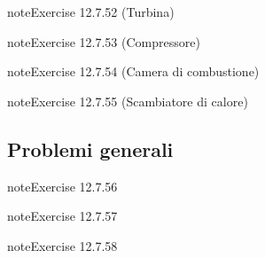 \documentclass[letterpaper,10pt,italian]{jupyterBook}
\begin{document}
\begin{sphinxadmonition}{note}{Exercise 12.7.52 (Turbina)}


\end{sphinxadmonition}
 \label{exercise:ch/thermodynamics/principles-problems-exercise-52}

\begin{sphinxadmonition}{note}{Exercise 12.7.53 (Compressore)}


\end{sphinxadmonition}
 \label{exercise:ch/thermodynamics/principles-problems-exercise-53}

\begin{sphinxadmonition}{note}{Exercise 12.7.54 (Camera di combustione)}


\end{sphinxadmonition}
 \label{exercise:ch/thermodynamics/principles-problems-exercise-54}

\begin{sphinxadmonition}{note}{Exercise 12.7.55 (Scambiatore di calore)}


\end{sphinxadmonition}


\subsection{Problemi generali}
\label{\detokenize{ch/thermodynamics/principles-problems:problemi-generali}} \label{exercise:ch/thermodynamics/principles-problems-exercise-55}

\begin{sphinxadmonition}{note}{Exercise 12.7.56}


\end{sphinxadmonition}
 \label{exercise:ch/thermodynamics/principles-problems-exercise-56}

\begin{sphinxadmonition}{note}{Exercise 12.7.57}


\end{sphinxadmonition}
 \label{exercise:ch/thermodynamics/principles-problems-exercise-57}

\begin{sphinxadmonition}{note}{Exercise 12.7.58}


\end{sphinxadmonition}

\sphinxstepscope
\end{document}
